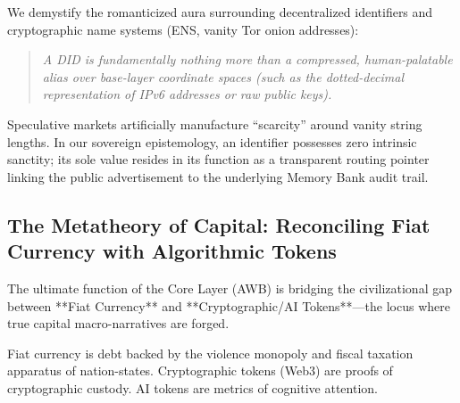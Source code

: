 \documentclass[11pt,a4paper]{article}
\begin{document}
We demystify the romanticized aura surrounding decentralized identifiers and cryptographic name systems (ENS, vanity Tor onion addresses):
\begin{quote}
\textit{A DID is fundamentally nothing more than a compressed, human-palatable alias over base-layer coordinate spaces (such as the dotted-decimal representation of IPv6 addresses or raw public keys).}
\end{quote}
Speculative markets artificially manufacture ``scarcity'' around vanity string lengths. In our sovereign epistemology, an identifier possesses zero intrinsic sanctity; its sole value resides in its function as a transparent routing pointer linking the public advertisement to the underlying Memory Bank audit trail.

\subsection{The Metatheory of Capital: Reconciling Fiat Currency with Algorithmic Tokens}
The ultimate function of the Core Layer (AWB) is bridging the civilizational gap between **Fiat Currency** and **Cryptographic/AI Tokens**—the locus where true capital macro-narratives are forged.

Fiat currency is debt backed by the violence monopoly and fiscal taxation apparatus of nation-states. Cryptographic tokens (Web3) are proofs of cryptographic custody. AI tokens are metrics of cognitive attention. 
\end{document}
